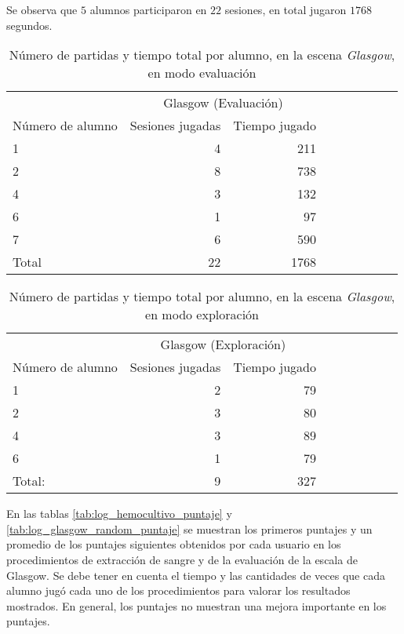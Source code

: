Se observa que $5$ alumnos participaron en $22$ sesiones, en total jugaron
$1768$ segundos.

\begin{table}[!hbt]
\centering
\begin{tabular}{lrrrrrrrr}
\toprule
& \multicolumn{2}{c}{Glasgow (Evaluación)} \\
                   \cmidrule(lr){2-3} 
Número de alumno   & Sesiones jugadas                            & Tiempo jugado \\
\midrule
1     & 4  & 211 \\
2     & 8  & 738 \\
4     & 3  & 132 \\
6     & 1  & 97  \\
7     & 6  & 590 \\
\midrule
Total & 22 & 1768 \\
\bottomrule
\end{tabular}
\caption{Número de partidas y tiempo total por alumno, en la escena
    \textit{Glasgow}, en modo evaluación}
\label{tab:log_glasgow_random_partida}
\end{table}


\begin{table}[!hbt]
\centering
\begin{tabular}{lrrrrrrrr}
\toprule
& \multicolumn{2}{c}{Glasgow (Exploración)} \\
                   \cmidrule(lr){2-3} 
Número de alumno   & Sesiones jugadas                            & Tiempo jugado \\
\midrule
1        & 2 & 79 \\
2        & 3 & 80 \\
4        & 3 & 89 \\
6        & 1 & 79 \\
\midrule
Total:   & 9 & 327 \\
\bottomrule
\end{tabular}
\caption{Número de partidas y tiempo total por alumno, en la escena
    \textit{Glasgow}, en modo exploración}
\label{tab:log_glasgow_custom_partida}
\end{table}


En las tablas \ref{tab:log_hemocultivo_puntaje} y
\ref{tab:log_glasgow_random_puntaje} se muestran los primeros puntajes y un
promedio de los puntajes siguientes obtenidos por cada usuario en los
procedimientos de extracción de sangre y de la evaluación de la escala de
Glasgow. Se debe tener en cuenta el tiempo y las cantidades de veces que cada
alumno jugó cada uno de los procedimientos para valorar los resultados
mostrados. En general, los puntajes no muestran una mejora importante en los
puntajes.

